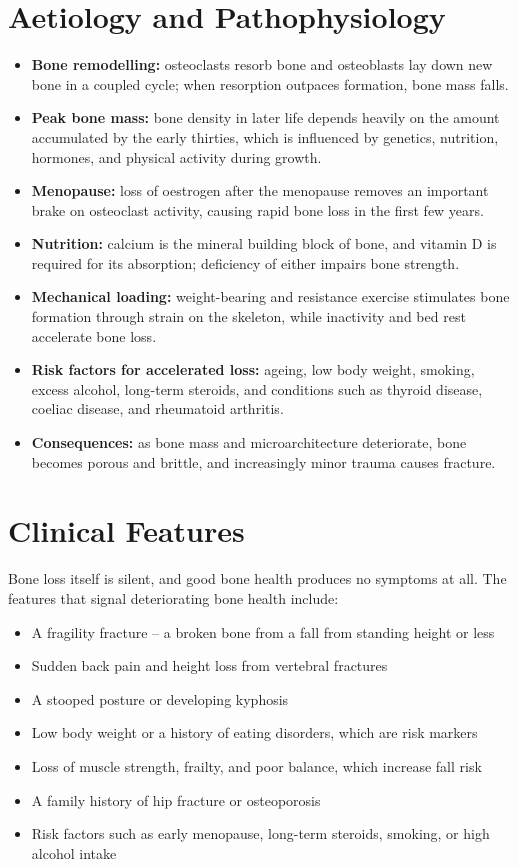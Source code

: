 \section*{Aetiology and Pathophysiology}
\begin{itemize}
    \item \textbf{Bone remodelling:} osteoclasts resorb bone and osteoblasts lay down new bone in a coupled cycle; when resorption outpaces formation, bone mass falls.
    \item \textbf{Peak bone mass:} bone density in later life depends heavily on the amount accumulated by the early thirties, which is influenced by genetics, nutrition, hormones, and physical activity during growth.
    \item \textbf{Menopause:} loss of oestrogen after the menopause removes an important brake on osteoclast activity, causing rapid bone loss in the first few years.
    \item \textbf{Nutrition:} calcium is the mineral building block of bone, and vitamin D is required for its absorption; deficiency of either impairs bone strength.
    \item \textbf{Mechanical loading:} weight-bearing and resistance exercise stimulates bone formation through strain on the skeleton, while inactivity and bed rest accelerate bone loss.
    \item \textbf{Risk factors for accelerated loss:} ageing, low body weight, smoking, excess alcohol, long-term steroids, and conditions such as thyroid disease, coeliac disease, and rheumatoid arthritis.
    \item \textbf{Consequences:} as bone mass and microarchitecture deteriorate, bone becomes porous and brittle, and increasingly minor trauma causes fracture.
\end{itemize}

\section*{Clinical Features}
Bone loss itself is silent, and good bone health produces no symptoms at all. The features that signal deteriorating bone health include:
\begin{itemize}
    \item A fragility fracture -- a broken bone from a fall from standing height or less
    \item Sudden back pain and height loss from vertebral fractures
    \item A stooped posture or developing kyphosis
    \item Low body weight or a history of eating disorders, which are risk markers
    \item Loss of muscle strength, frailty, and poor balance, which increase fall risk
    \item A family history of hip fracture or osteoporosis
    \item Risk factors such as early menopause, long-term steroids, smoking, or high alcohol intake
\end{itemize}


